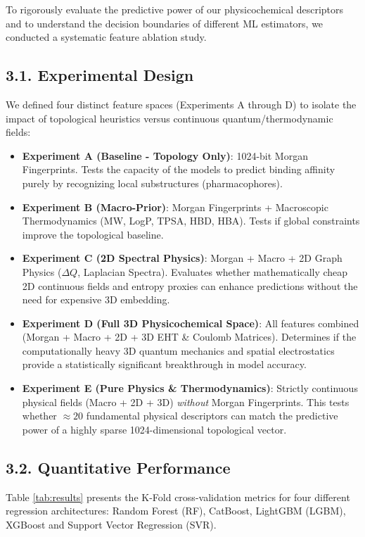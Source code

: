 \documentclass[11pt, a4paper]{article}
\begin{document}
To rigorously evaluate the predictive power of our physicochemical descriptors and to understand the decision boundaries of different ML estimators,
we conducted a systematic feature ablation study.

\subsection*{3.1. Experimental Design}
We defined four distinct feature spaces (Experiments A through D) to isolate the impact of topological heuristics versus continuous
quantum/thermodynamic fields:
\begin{itemize}[leftmargin=*]
    \item \textbf{Experiment A (Baseline - Topology Only)}: 1024-bit Morgan Fingerprints. Tests the capacity of the models to predict binding
    affinity purely by recognizing local substructures (pharmacophores).
    \item \textbf{Experiment B (Macro-Prior)}: Morgan Fingerprints + Macroscopic Thermodynamics (MW, LogP, TPSA, HBD, HBA). Tests if global
    constraints improve the topological baseline.
    \item \textbf{Experiment C (2D Spectral Physics)}: Morgan + Macro + 2D Graph Physics ($\Delta Q$, Laplacian Spectra). Evaluates whether
    mathematically cheap 2D continuous fields and entropy proxies can enhance predictions without the need for expensive 3D embedding.
    \item \textbf{Experiment D (Full 3D Physicochemical Space)}: All features combined (Morgan + Macro + 2D + 3D EHT \& Coulomb Matrices).
    Determines if the computationally heavy 3D quantum mechanics and spatial electrostatics provide a statistically significant breakthrough in
    model accuracy.
    \item \textbf{Experiment E (Pure Physics \& Thermodynamics)}: Strictly continuous physical fields (Macro + 2D + 3D) \textit{without}
    Morgan Fingerprints. This tests whether $\approx 20$ fundamental physical descriptors can match the predictive power of a highly sparse
    1024-dimensional topological vector.
\end{itemize}

\subsection*{3.2. Quantitative Performance}
Table \ref{tab:results} presents the K-Fold cross-validation metrics for four different regression architectures:
Random Forest (RF), CatBoost, LightGBM (LGBM), XGBoost and Support Vector Regression (SVR). 
\end{document}
